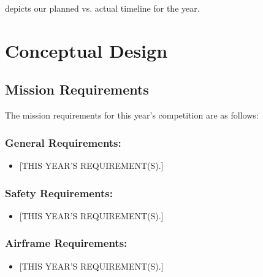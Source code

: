 \documentclass[report]{byu-aero}
\begin{document}
 depicts our planned vs. actual timeline for the year.
 \lipsum[2]



\section{Conceptual Design} %
\label{sec:ConceptualDesign}


\subsection{Mission Requirements}
\label{ssec:missionreqs}

The mission requirements for this year's competition are as follows:

\subsubsection{General Requirements:}
\begin{itemize}
	\item {\color{\BYUred} [THIS YEAR'S REQUIREMENT(S).]}
\end{itemize}


\subsubsection{Safety Requirements:}
\begin{itemize}
	\item {\color{\BYUred} [THIS YEAR'S REQUIREMENT(S).]}
\end{itemize}


\subsubsection{Airframe Requirements:}
\begin{itemize}
	\item {\color{\BYUred} [THIS YEAR'S REQUIREMENT(S).]}
\end{itemize}
\end{document}
